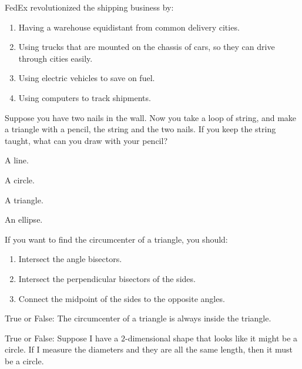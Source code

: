 \documentclass[nooutcomes,noauthor]{ximera}
\author{Bart Snapp}
\begin{document}
\maketitle



\begin{exercise}
  FedEx revolutionized the shipping business by:
    \begin{enumerate}
    \item Having a warehouse equidistant from common delivery cities.
    \item Using trucks that are mounted on the chassis of cars, so they
      can drive through cities easily.
    \item Using electric vehicles to save on fuel.
    \item Using computers to track shipments.
    \end{enumerate}
\end{exercise}





\begin{exercise}
  Suppose you have two nails in the wall. Now you take a loop of
  string, and make a triangle with a pencil, the string and the two
  nails. If you keep the string taught, what can you draw with your
  pencil?
    \begin{enumerate}
\begin{multicols}{2}
 \item A line.
 \item A circle. 
 \item A triangle.
 \item An ellipse.
\end{multicols}
\end{enumerate}
\end{exercise}

\begin{exercise}
  If you want to find the circumcenter of a triangle, you should:
  \begin{enumerate}
  \item Intersect the angle bisectors.
  \item Intersect the perpendicular bisectors of the sides.
  \item Connect the midpoint of the sides to the opposite angles.
  \end{enumerate}
\end{exercise}


\begin{exercise}
  True or False: The circumcenter of a triangle is always inside the
  triangle.
\end{exercise}


\begin{exercise}True or False:
  Suppose I have a $2$-dimensional shape that looks like it might be a
  circle. If I measure the diameters and they are all the same length, then
  it must be a circle.
\end{exercise}

\end{document}
